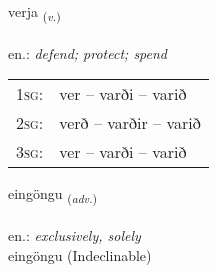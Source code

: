\documentclass[frontgrid, backgrid]{flacards}\usepackage[]{graphicx}\usepackage[]{xcolor}
\begin{document}
{verja \small{\textsubscript{(\textit{v.})}} \\[1ex] %
\textphonetic{[vɛrja]} \\
en.: \emph{defend; protect; spend} \\  [2ex]
\renewcommand*{\arraystretch}{0.8}
\begin{tabular}{p{1cm}l}
\textsc{1sg}: & ver -- varði -- varið \\ 
\textsc{2sg}: & verð -- varðir -- varið \\ 
\textsc{3sg}: & ver -- varði -- varið \\ 
\end{tabular}
}


\renewcommand{\flhead}{\vskip5pt \fboxsep=0pt {\small\bfseries\footnotesize Atviksorð | Adverb}}
\renewcommand{\fcfoot}{\vskip5pt \fboxsep=0pt \hspace{2pt}{\small\bfseries\footnotesize 1K}}

\renewcommand{\blhead}{\vskip5pt {\small\bfseries\footnotesize Atviksorð | Adverb }}
\renewcommand{\bcfoot}{\vskip5pt \hspace{2pt}{\small\bfseries\footnotesize 1K}}


{eingöngu \small{\textsubscript{(\textit{adv.})}} \\[1ex]
\textphonetic{[eiŋkœiŋkʏ]} \\
en.: \emph{exclusively, solely} \\  [2ex]
eingöngu (Indeclinable)}

\renewcommand{\flhead}{\vskip5pt \fboxsep=0pt {\small\bfseries\footnotesize Nafnorð | Noun}}
\renewcommand{\fcfoot}{\vskip5pt \fboxsep=0pt \hspace{2pt}{\small\bfseries\footnotesize 1K}}

\renewcommand{\blhead}{\vskip5pt {\small\bfseries\footnotesize Nafnorð | Noun }}
\renewcommand{\bcfoot}{\vskip5pt \hspace{2pt}{\small\bfseries\footnotesize 1K}}
\end{document}
